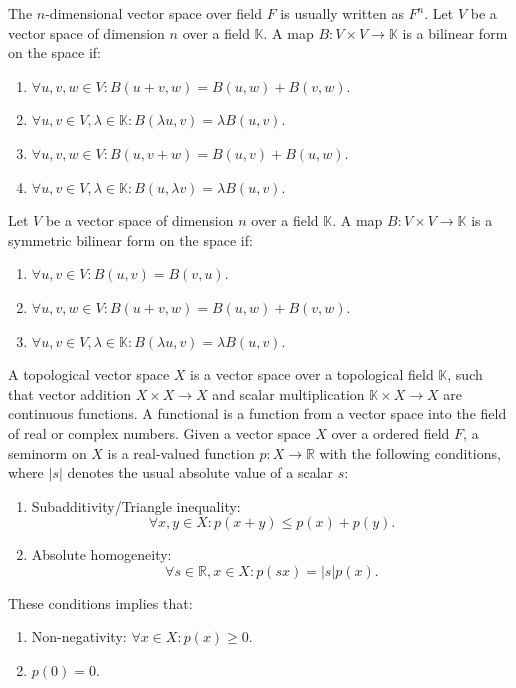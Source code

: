 \documentclass[a4paper,12pt]{article}
\begin{document}
The $n$-dimensional vector space over field $F$ is usually written as $F^n$.
Let $V$ be a vector space of dimension $n$ over a field $\mathbb{K}$. A map $B\colon V\times V\rightarrow \mathbb{K}$ is a bilinear form on the space if:
\begin{enumerate}
\item $\forall u,v,w\in V\colon B(u+v,w)=B(u,w)+B(v,w)$.
\item $\forall u,v\in V,\lambda\in \mathbb{K}\colon B(\lambda u,v)=\lambda B(u,v)$.
\item $\forall u,v,w\in V\colon B(u,v+w)=B(u,v)+B(u,w)$.
\item $\forall u,v\in V,\lambda\in \mathbb{K}\colon B(u,\lambda v)=\lambda B(u,v)$.
\end{enumerate}
Let $V$ be a vector space of dimension $n$ over a field $\mathbb{K}$. A map $B\colon V\times V\rightarrow \mathbb{K}$ is a symmetric bilinear form on the space if:
\begin{enumerate}
\item $\forall u,v\in V\colon B(u,v)=B(v,u)$.
\item $\forall u,v,w\in V\colon B(u+v,w)=B(u,w)+B(v,w)$.
\item $\forall u,v\in V,\lambda\in \mathbb{K}\colon B(\lambda u,v)=\lambda B(u,v)$.
\end{enumerate}
A topological vector space $X$ is a vector space over a topological field $\mathbb{K}$, such that vector addition $X\times X\to X$ and scalar multiplication $\mathbb{K}\times X \to X$ are continuous functions.
A functional is a function from a vector space into the field of real or complex numbers.
Given a vector space $X$ over a ordered field $F$, a seminorm on $X$ is a real-valued function $p\colon X\to\mathbb{R}$ with the following conditions, where $|s|$ denotes the usual absolute value of a scalar $s$:
\begin{enumerate}
\item Subadditivity/Triangle inequality:\[\forall x,y\in X\colon p(x+y)\leq p(x)+p(y).\]
\item Absolute homogeneity: \[\forall s\in\mathbb{R},x\in X\colon p(sx)=|s|p(x).\]
\end{enumerate}
These conditions implies that:
\begin{enumerate}
\item Non-negativity: $\forall x\in X\colon p(x)\geq 0$.
\item $p(0)=0$.
\end{enumerate}
\end{document}
